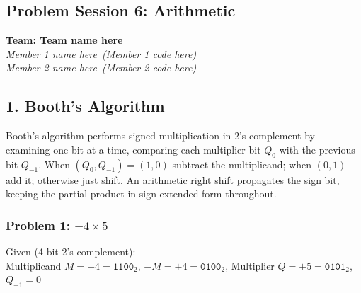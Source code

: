 \documentclass{article}
\newcommand{\TeamName}{Team name here}
\newcommand{\MemberOne}{Member 1 name here}
\newcommand{\MemberOneCode}{Member 1 code here}
\newcommand{\MemberTwo}{Member 2 name here}
\newcommand{\MemberTwoCode}{Member 2 code here}
\begin{document}
\begin{center}
\section*{Problem Session 6: Arithmetic}
\textbf{Team: \TeamName}\\
\textit{\MemberOne\ (\MemberOneCode)}\\
\textit{\MemberTwo\ (\MemberTwoCode)}
\end{center}

\subsection*{1. Booth's Algorithm}

Booth's algorithm performs signed multiplication in 2's complement by examining one
bit at a time, comparing each multiplier bit $Q_0$ with the previous bit $Q_{-1}$.
When $(Q_0, Q_{-1}) = (1,0)$ subtract the multiplicand; when $(0,1)$ add it;
otherwise just shift.  An arithmetic right shift propagates the sign bit, keeping
the partial product in sign-extended form throughout.

\subsubsection*{Problem 1: $-4 \times 5$}

\noindent
Given (4-bit 2's complement):\\
Multiplicand $M = -4 = \texttt{1100}_2$,\quad
$-M = +4 = \texttt{0100}_2$,\quad
Multiplier $Q = +5 = \texttt{0101}_2$,\quad
$Q_{-1} = 0$
\end{document}
